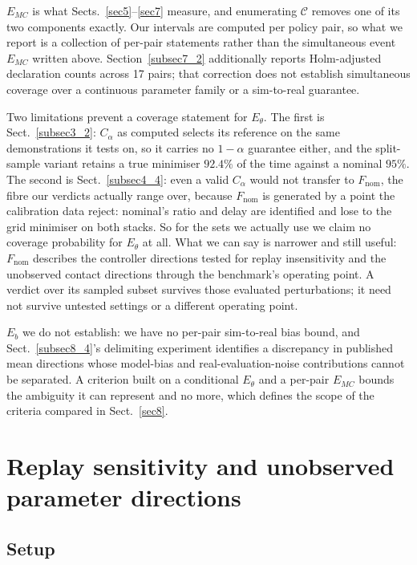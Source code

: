 \documentclass[pdflatex,iicol,sn-apa]{sn-jnl}
\theoremstyle{remark}
\begin{document}
$E_{MC}$ is what Sects.~\ref{sec5}--\ref{sec7} measure, and enumerating $\mathcal{C}$ removes one of
its two components exactly. Our intervals are computed per policy pair, so
what we report is a collection of per-pair statements rather than the simultaneous event
$E_{MC}$ written above. Section~\ref{subsec7_2} additionally reports Holm-adjusted declaration counts
across 17 pairs; that correction does not establish simultaneous coverage over a continuous
parameter family or a sim-to-real guarantee.

Two limitations prevent a coverage statement for $E_\theta$. The first is Sect.~\ref{subsec3_2}: $C_\alpha$ as computed selects its reference on the same
demonstrations it tests on, so it carries no $1-\alpha$ guarantee either, and the split-sample
variant retains a true minimiser $92.4\%$ of the time against a nominal $95\%$. The second is
Sect.~\ref{subsec4_4}: even a valid $C_\alpha$ would not transfer to $F_{\mathrm{nom}}$, the fibre
our verdicts actually range over, because $F_{\mathrm{nom}}$ is generated by a
point the calibration data reject: nominal's ratio and delay are identified and lose to the grid
minimiser on both stacks. So for the sets we actually use we claim no coverage
probability for $E_\theta$ at all. What we can say is narrower and still useful: $F_{\mathrm{nom}}$
describes the controller directions tested for replay insensitivity and the unobserved contact
directions through the benchmark's operating point. A verdict over its sampled subset survives
those evaluated perturbations; it need not survive untested settings or a different operating point.

$E_b$ we do not establish: we have no per-pair sim-to-real bias bound, and
Sect.~\ref{subsec8_4}'s delimiting experiment identifies a discrepancy in published mean directions
whose model-bias and real-evaluation-noise contributions cannot be separated. A criterion built on
a conditional $E_\theta$ and a per-pair $E_{MC}$ bounds
the ambiguity it can represent and no more, which defines the scope of the criteria compared in Sect.~\ref{sec8}.

\section{Replay sensitivity and unobserved parameter directions}\label{sec4}

\subsection{Setup}\label{subsec4_1}
\end{document}
